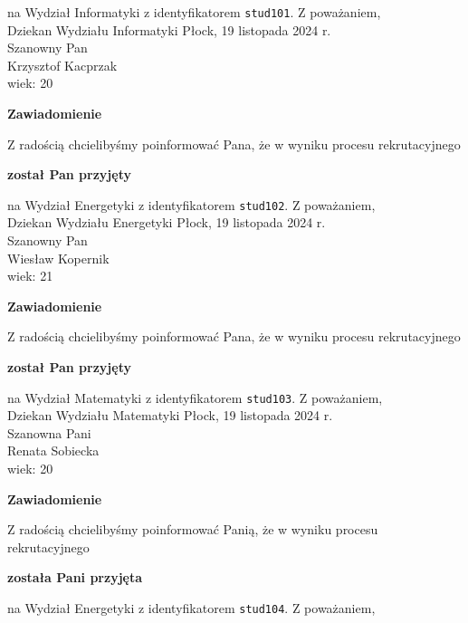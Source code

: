 \documentclass[12pt,a4paper]{article}
\begin{document}
na Wydział Informatyki z identyfikatorem \verb|stud101|. 
\vspace{2cm}
\noindent
Z poważaniem, \\
Dziekan
Wydziału Informatyki
\newpage
\hfill Płock, 19 listopada 2024 r. \\
\noindent
Szanowny Pan \\
Krzysztof Kacprzak \\
wiek: 20
\bigskip
\begin{center}
    {\Large\textbf{Zawiadomienie}}
\end{center}
\bigskip 
Z radością chcielibyśmy poinformować Pana, że w wyniku procesu rekrutacyjnego
\begin{center}
\textsf{\textbf{został Pan przyjęty}}
\end{center}
na Wydział Energetyki z identyfikatorem \verb|stud102|. 
\vspace{2cm}
\noindent
Z poważaniem, \\
Dziekan
Wydziału Energetyki
\newpage
\hfill Płock, 19 listopada 2024 r. \\
\noindent
Szanowny Pan \\
Wiesław Kopernik \\
wiek: 21
\bigskip
\begin{center}
    {\Large\textbf{Zawiadomienie}}
\end{center}
\bigskip 
Z radością chcielibyśmy poinformować Pana, że w wyniku procesu rekrutacyjnego
\begin{center}
\textsf{\textbf{został Pan przyjęty}}
\end{center}
na Wydział Matematyki z identyfikatorem \verb|stud103|. 
\vspace{2cm}
\noindent
Z poważaniem, \\
Dziekan
Wydziału Matematyki
\newpage
\hfill Płock, 19 listopada 2024 r. \\
\noindent
Szanowna Pani \\
Renata Sobiecka  \\
wiek: 20
\bigskip
\begin{center}
    {\Large\textbf{Zawiadomienie}}
\end{center}
\bigskip 
Z radością chcielibyśmy poinformować Panią, że w wyniku procesu rekrutacyjnego
\begin{center}
\textsf{\textbf{została Pani przyjęta}}
\end{center}
na Wydział Energetyki z identyfikatorem \verb|stud104|. 
\vspace{2cm}
\noindent
Z poważaniem, \\
\end{document}

